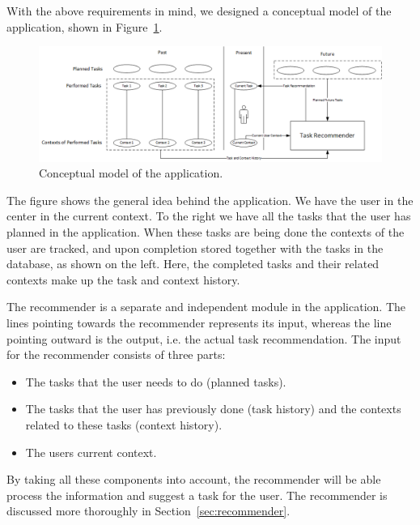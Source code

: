 With the above requirements in mind, we designed a conceptual model of the application, shown in Figure~\ref{fig:conceptualmodel}.
\begin{figure}[tbp]
  \centering
  \includegraphics[width=\textwidth]{figures/ConceptualDiagram.png}
  \caption[Conceptual model]{Conceptual model of the application.}
  \label{fig:conceptualmodel}
\end{figure}
The figure shows the general idea behind the application. We have the user in the center in the current context. To the right we have all the tasks that the user has planned in the application. When these tasks are being done the contexts of the user are tracked, and upon completion stored together with the tasks in the database, as shown on the left. Here, the completed tasks and their related contexts make up the task and context history.

The recommender is a separate and independent module in the application. The lines pointing towards the recommender represents its input, whereas the line pointing outward is the output, i.e. the actual task recommendation. The input for the recommender consists of three parts:
\begin{itemize}
	\item The tasks that the user needs to do (planned tasks).
	\item The tasks that the user has previously done (task history) and the contexts related to these tasks (context history).
	\item The users current context.
\end{itemize}
By taking all these components into account, the recommender will be able process the information and suggest a task for the user. The recommender is discussed more thoroughly in Section~\ref{sec:recommender}.


